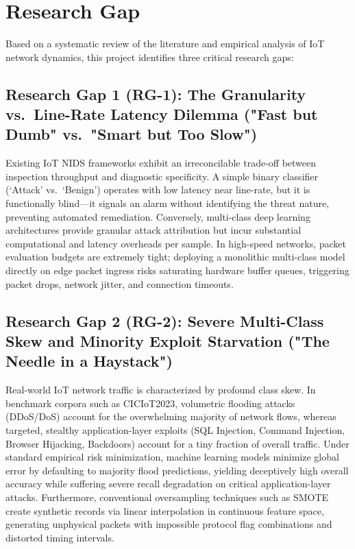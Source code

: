 \documentclass[12pt,a4paper]{report}
\begin{document}
\section{Research Gap}
Based on a systematic review of the literature and empirical analysis of IoT network dynamics, this project identifies three critical research gaps:

\subsection*{Research Gap 1 (RG-1): The Granularity vs.\ Line-Rate Latency Dilemma ("Fast but Dumb" vs.\ "Smart but Too Slow")}
Existing IoT NIDS frameworks exhibit an irreconcilable trade-off between inspection throughput and diagnostic specificity. 
A simple binary classifier (`Attack' vs.\ `Benign') operates with low latency near line-rate, but it is functionally blind—it signals an alarm without identifying the threat nature, preventing automated remediation. 
Conversely, multi-class deep learning architectures provide granular attack attribution but incur substantial computational and latency overheads per sample. 
In high-speed networks, packet evaluation budgets are extremely tight; deploying a monolithic multi-class model directly on edge packet ingress risks saturating hardware buffer queues, triggering packet drops, network jitter, and connection timeouts.

\subsection*{Research Gap 2 (RG-2): Severe Multi-Class Skew and Minority Exploit Starvation ("The Needle in a Haystack")}
Real-world IoT network traffic is characterized by profound class skew. In benchmark corpora such as CICIoT2023, volumetric flooding attacks (DDoS/DoS) account for the overwhelming majority of network flows, whereas targeted, stealthy application-layer exploits (SQL Injection, Command Injection, Browser Hijacking, Backdoors) account for a tiny fraction of overall traffic. 
Under standard empirical risk minimization, machine learning models minimize global error by defaulting to majority flood predictions, yielding deceptively high overall accuracy while suffering severe recall degradation on critical application-layer attacks. 
Furthermore, conventional oversampling techniques such as SMOTE create synthetic records via linear interpolation in continuous feature space, generating unphysical packets with impossible protocol flag combinations and distorted timing intervals.
\end{document}

